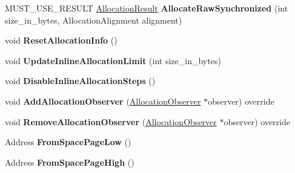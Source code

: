 \begin{DoxyCompactItemize}
\item 
M\+U\+S\+T\+\_\+\+U\+S\+E\+\_\+\+R\+E\+S\+U\+LT \hyperlink{classv8_1_1internal_1_1_allocation_result}{Allocation\+Result} {\bfseries Allocate\+Raw\+Synchronized} (int size\+\_\+in\+\_\+bytes, Allocation\+Alignment alignment)\hypertarget{classv8_1_1internal_1_1_new_space_a2e0fd7bb589d858a62b00b88a45ca2e8}{}\label{classv8_1_1internal_1_1_new_space_a2e0fd7bb589d858a62b00b88a45ca2e8}

\item 
void {\bfseries Reset\+Allocation\+Info} ()\hypertarget{classv8_1_1internal_1_1_new_space_a76b5e11eb122d9ab2befeca74f56f001}{}\label{classv8_1_1internal_1_1_new_space_a76b5e11eb122d9ab2befeca74f56f001}

\item 
void {\bfseries Update\+Inline\+Allocation\+Limit} (int size\+\_\+in\+\_\+bytes)\hypertarget{classv8_1_1internal_1_1_new_space_a9c081121e110dbbe21e77e3be21e9e04}{}\label{classv8_1_1internal_1_1_new_space_a9c081121e110dbbe21e77e3be21e9e04}

\item 
void {\bfseries Disable\+Inline\+Allocation\+Steps} ()\hypertarget{classv8_1_1internal_1_1_new_space_aa216fb1f868ee88107475042be5b5eaf}{}\label{classv8_1_1internal_1_1_new_space_aa216fb1f868ee88107475042be5b5eaf}

\item 
void {\bfseries Add\+Allocation\+Observer} (\hyperlink{classv8_1_1internal_1_1_allocation_observer}{Allocation\+Observer} $\ast$observer) override\hypertarget{classv8_1_1internal_1_1_new_space_a125db29d2c63f89a6417eecfb3bdbbee}{}\label{classv8_1_1internal_1_1_new_space_a125db29d2c63f89a6417eecfb3bdbbee}

\item 
void {\bfseries Remove\+Allocation\+Observer} (\hyperlink{classv8_1_1internal_1_1_allocation_observer}{Allocation\+Observer} $\ast$observer) override\hypertarget{classv8_1_1internal_1_1_new_space_ad9ae39fb577fa3bab0d4d2ea7d59b0ad}{}\label{classv8_1_1internal_1_1_new_space_ad9ae39fb577fa3bab0d4d2ea7d59b0ad}

\item 
Address {\bfseries From\+Space\+Page\+Low} ()\hypertarget{classv8_1_1internal_1_1_new_space_ad7aaea88d9ac7c1f7f2cd43040858c8f}{}\label{classv8_1_1internal_1_1_new_space_ad7aaea88d9ac7c1f7f2cd43040858c8f}

\item 
Address {\bfseries From\+Space\+Page\+High} ()\hypertarget{classv8_1_1internal_1_1_new_space_a33df91858d38af93ce62ea76b28e903a}{}\label{classv8_1_1internal_1_1_new_space_a33df91858d38af93ce62ea76b28e903a}


\end{DoxyCompactItemize}
